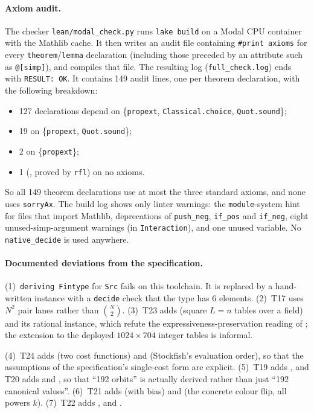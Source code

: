 \paragraph{Axiom audit.}
The checker \texttt{lean/modal\_check.py} runs \texttt{lake build} on a Modal CPU container with the Mathlib cache.
It then writes an audit file containing \texttt{\#print axioms} for every \texttt{theorem}/\texttt{lemma} declaration (including those preceded by an attribute such as \texttt{@[simp]}), and compiles that file.
The resulting log (\texttt{full\_check.log}) ends with \texttt{RESULT: OK}.
It contains 149 audit lines, one per theorem declaration, with the following breakdown:
\begin{itemize}[leftmargin=*,itemsep=1pt]
\item 127 declarations depend on \{\texttt{propext}, \texttt{Classical.choice}, \texttt{Quot.sound}\};
\item 19 on \{\texttt{propext}, \texttt{Quot.sound}\};
\item 2 on \{\texttt{propext}\};
\item 1 (, proved by \texttt{rfl}) on no axioms.
\end{itemize}
So all 149 theorem declarations use at most the three standard axioms, and none uses \texttt{sorryAx}.
The build log shows only linter warnings: the \texttt{module}-system hint for files that import Mathlib, deprecations of \texttt{push\_neg}, \texttt{if\_pos} and \texttt{if\_neg}, eight unused-simp-argument warnings (in \texttt{Interaction}), and one unused variable.
No \texttt{native\_decide} is used anywhere.

\paragraph{Documented deviations from the specification.}
(1)~\texttt{deriving Fintype} for \texttt{Src} fails on this toolchain. It is replaced by a hand-written instance with a \texttt{decide} check that the type has 6 elements.
(2)~T17 uses $N^2$ pair lanes rather than $\binom N2$.
(3)~T23 adds  (square $L=n$ tables over a field) and its rational instance, which refute the expressiveness-preservation reading of ; the extension to the deployed $1024\times704$ integer tables is informal.

(4)~T24 adds  (two cost functions) and  (Stockfish's evaluation order), so that the assumptions of the specification's single-cost form are explicit.
(5)~T19 adds , and T20 adds  and , so that ``192 orbits'' is actually derived rather than just ``192 canonical values''.
(6)~T21 adds  (with bias) and  (the concrete colour flip, all powers $k$).
(7)~T22 adds ,  and .

